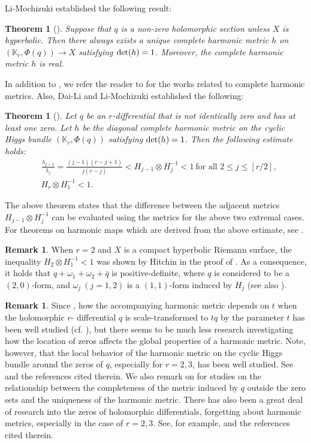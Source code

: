 \documentclass[12pt]{article}
\theoremstyle{definition}
\newtheorem{theo}[defi]{Theorem}
\newtheorem{rem}[defi]{Remark}
\def\det{{\rm det}}
\def\det{{\rm det}}
\def\K{{\mathbb K}}
\begin{document}
Li-Mochizuki \cite{LM1} established the following result:
\begin{theo}[\cite{LM1}]{\it Suppose that $q$ is a non-zero holomorphic section unless $X$ is hyperbolic. Then there always exists a unique complete harmonic metric $h$ on $(\K_r,\Phi(q))\rightarrow X$ satisfying $\det(h)=1$. Moreover, the complete harmonic metric $h$ is real.
}
\end{theo}
In addition to \cite{LM1}, we refer the reader to \cite{DL3, DW1, GL1, LT1, LTW1, Li1, LM2, Moc0, Moc1, Nie1, Wan1, WA1} for the works related to complete harmonic metrics. Also, Dai-Li \cite{DL1, DL2} and Li-Mochizuki \cite{LM1} established the following:
\begin{theo}[\cite{DL1,DL2, LM1}]\label{estimate} 
{\it Let $q$ be an $r$-differential that is not identically zero and has at least one zero. Let $h$ be the diagonal complete harmonic metric on the cyclic Higgs bundle $(\K_r,\Phi(q))$ satisfying $\det(h)=1$. Then the following estimate holds:
\begin{align}
&\frac{\lambda_{j-1}}{\lambda_j}=\frac{(j-1)(r-j+1)}{j(r-j)} < H_{j-1}\otimes H_j^{-1} < 1 \ \text{for all $2\leq j\leq [r/2]$},\label{r/2}\\
& H_r\otimes H_1^{-1} < 1.
\end{align}
}
\end{theo}
The above theorem states that the difference between the adjacent metrics $H_{j-1}\otimes H_j^{-1}$ can be evaluated using the metrics for the above two extremal cases. For theorems on harmonic maps which are derived from the above estimate, see \cite{DL1, DL2, DL3, LM1}.

\begin{rem} When $r=2$ and $X$ is a compact hyperbolic Riemann surface, the inequality $H_2\otimes H_1^{-1}<1$ was shown by Hitchin in the proof of \cite[Theorem 11.2]{Hit1}.
As a consequence, it holds that $q+\omega_1+\omega_2+\bar{q}$ is positive-definite, where $q$ is considered to be a $(2,0)$-form, and $\omega_j \ (j=1,2)$ is a $(1,1)$-form induced by $H_j$ (see also \cite[Theorem 3.1]{Wol1}). 
\end{rem}
\begin{rem} Since \cite{Wol1}, how the accompanying harmonic metric depends on $t$ when the holomorphic $r$- differential $q$ is scale-transformed to $tq$ by the parameter $t$ has been well studied (cf. \cite{CL1, DL2, DW1, Lof1, LoTW1, Sak1, Wol1}), but there seems to be much less research investigating how the location of zeros affects the global properties of a harmonic metric. Note, however, that the local behavior of the harmonic metric on the cyclic Higgs bundle around the zeros of $q$, especially for $r=2,3$, has been well studied. See \cite[Section 1.8]{DW1} and the references cited therein. We also remark on \cite{Li1, LM1, LM2, Nie1} for studies on the relationship between the completeness of the metric induced by $q$ outside the zero sets and the uniqueness of the harmonic metric. There has also been a great deal of research into the zeros of holomorphic differentials, forgetting about harmonic metrics, especially in the case of $r=2,3$. See, for example, \cite{BS1, DW1, Kus1, Mas1} and the references cited therein.
\end{rem}
\end{document}
